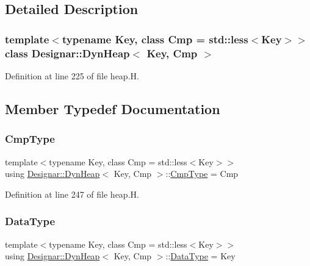 \subsection{Detailed Description}
\subsubsection*{template$<$typename Key, class Cmp = std\+::less$<$\+Key$>$$>$\newline
class Designar\+::\+Dyn\+Heap$<$ Key, Cmp $>$}



Definition at line 225 of file heap.\+H.



\subsection{Member Typedef Documentation}
\mbox{\label{class_designar_1_1_dyn_heap_af4eef9bc99b80f175c541cabff5333e0}} 
\subsubsection{\texorpdfstring{Cmp\+Type}{CmpType}}
{\footnotesize\ttfamily template$<$typename Key, class Cmp = std\+::less$<$\+Key$>$$>$ \\
using \hyperlink{class_designar_1_1_dyn_heap}{Designar\+::\+Dyn\+Heap}$<$ Key, Cmp $>$\+::\hyperlink{class_designar_1_1_dyn_heap_af4eef9bc99b80f175c541cabff5333e0}{Cmp\+Type} =  Cmp}



Definition at line 247 of file heap.\+H.

\mbox{\label{class_designar_1_1_dyn_heap_aa4011e735cd33c5043f59ae43a2ce318}} 
\subsubsection{\texorpdfstring{Data\+Type}{DataType}}
{\footnotesize\ttfamily template$<$typename Key, class Cmp = std\+::less$<$\+Key$>$$>$ \\
using \hyperlink{class_designar_1_1_dyn_heap}{Designar\+::\+Dyn\+Heap}$<$ Key, Cmp $>$\+::\hyperlink{class_designar_1_1_fixed_array_a3e37931b909b840cb7a40fc73f12bcf5}{Data\+Type} =  Key}



